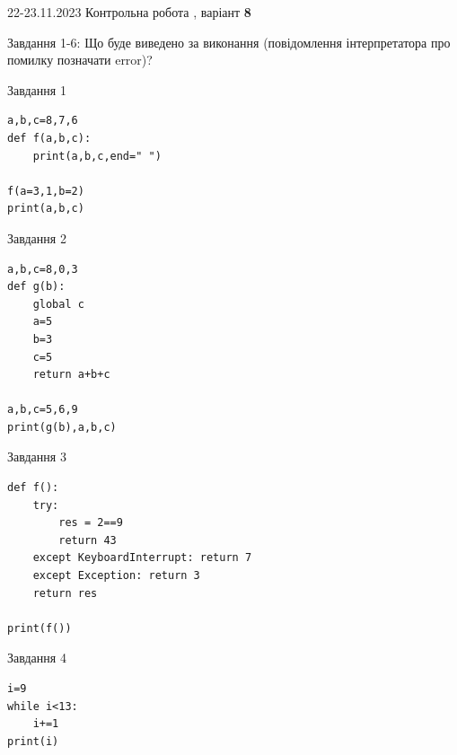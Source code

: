 \documentclass[12pt, ukrainian]{article}
\begin{document}
{{22-23.11.2023 Контрольна робота , варіант  \No \textbf { 8 }\par}}
{

Завдання 1-6: Що буде виведено за виконання (повідомлення інтерпретатора про помилку позначати error)?


\begin{minipage}[t]{9.7cm}                
{\begin{center}Завдання {1}\end{center}}
\begin{verbatim}
a,b,c=8,7,6
def f(a,b,c):
    print(a,b,c,end=" ")

f(a=3,1,b=2)
print(a,b,c)
\end{verbatim}     
\end{minipage}
\vline \hspace{8mm}
\begin{minipage}[t]{8.0cm}                
{\begin{center}Завдання {2}\end{center}}
\begin{verbatim}
a,b,c=8,0,3
def g(b):
    global c
    a=5
    b=3
    c=5
    return a+b+c

a,b,c=5,6,9
print(g(b),a,b,c)
\end{verbatim}     
\end{minipage}

\vspace{15mm}
\begin{minipage}[t]{9.7cm}                
{\begin{center}Завдання {3}\end{center}}
\begin{verbatim}
def f():
    try:
        res = 2==9
        return 43
    except KeyboardInterrupt: return 7
    except Exception: return 3
    return res

print(f())
\end{verbatim}     
\end{minipage}
\vline \hspace{8mm}
\begin{minipage}[t]{8.0cm}                
{\begin{center}Завдання {4}\end{center}}
\begin{verbatim}
i=9
while i<13:
    i+=1
print(i)
\end{verbatim}     
\end{minipage}

}
\end{document}
